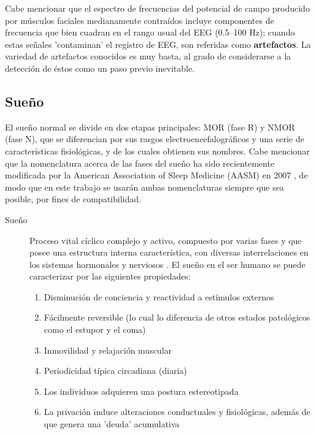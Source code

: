 \documentclass[12pt,a4paper]{mitthesis}
\begin{document}
Cabe mencionar que el espectro de frecuencias del potencial de campo producido por m\'usculos 
faciales medianamente contra\'idos incluye componentes de frecuencia que bien cuadran en el rango 
usual del EEG (0.5--100 Hz); cuando estas se\~nales 'contaminan' el registro de EEG, son referidas
como \textbf{artefactos}. La variedad de artefactos conocidos es muy basta, al grado de
considerarse a la detecci\'on de \'estos como un paso previo inevitable.


\subsection{Sue\~no}

El sue\~no normal se divide en dos etapas principales: MOR (fase R) y NMOR (fase N), que se 
diferencian por sus rasgos electroencefalogr\'aficos y una serie de caracter\'isticas 
fisiol\'ogicas, y de los cuales obtienen sus nombres.
Cabe mencionar que la nomenclatura acerca de las fases del sue\~no ha sido recientemente modificada 
por la American Association of Sleep Medicine (AASM) en 2007 \cite{AASM07}, de modo que en este 
trabajo se  usar\'an ambas nomenclaturas siempre que sea posible, por fines de compatibilidad.

\begin{description}
\item[Sue\~no] Proceso vital c\'iclico complejo y activo, compuesto por varias fases y que posee 
una estructura interna caracter\'istica, con diversas interrelaciones en los sistemas hormonales y 
nerviosos \cite{FernandezConde07}.
El sue\~no en el ser humano se puede caracterizar por las siguientes 
propiedades\cite{CarrilloMora}:
\begin{enumerate}
\item Disminuci\'on de conciencia y reactividad a est\'imulos externos
\item F\'acilmente reversible (lo cual lo diferencia de otros estados 
patol\'ogicos como el estupor y el coma)
\item Inmovilidad y relajaci\'on muscular
\item Periodicidad t\'ipica circadiana (diaria)
\item Los individuos adquieren una postura estereotipada
\item La privaci\'on induce alteraciones conductuales y 
fisiol\'ogicas, adem\'as de que genera una 'deuda' acumulativa
\end{enumerate}
\end{description}
\end{document}
